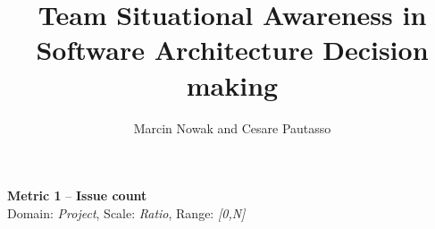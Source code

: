 \documentclass[article]{elsarticle}
\begin{document}
\begin{frontmatter}



\title{Team Situational Awareness in Software Architecture Decision making}


\author{Marcin Nowak and Cesare Pautasso}


\end{frontmatter}

\noindent
\textbf{Metric 1} -- \textbf{Issue count} \\
Domain: \emph{Project}, Scale: \emph{Ratio}, Range: \emph{[0,N]}
\end{document}
